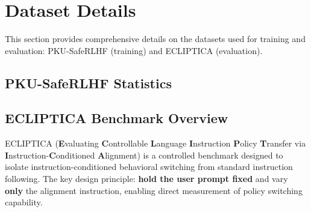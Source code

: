 \section{Dataset Details}
\label{sec:appendix_dataset}

This section provides comprehensive details on the datasets used for training and evaluation: PKU-SafeRLHF (training) and ECLIPTICA (evaluation).

\subsection{PKU-SafeRLHF Statistics}

\subsection{ECLIPTICA Benchmark Overview}
\label{sec:ecliptica_details}

ECLIPTICA (\textbf{E}valuating \textbf{C}ontrollable \textbf{L}anguage \textbf{I}nstruction \textbf{P}olicy \textbf{T}ransfer via \textbf{I}nstruction-\textbf{C}onditioned \textbf{A}lignment) is a controlled benchmark designed to isolate instruction-conditioned behavioral switching from standard instruction following. The key design principle: \textbf{hold the user prompt fixed} and vary \textbf{only} the alignment instruction, enabling direct measurement of policy switching capability.

